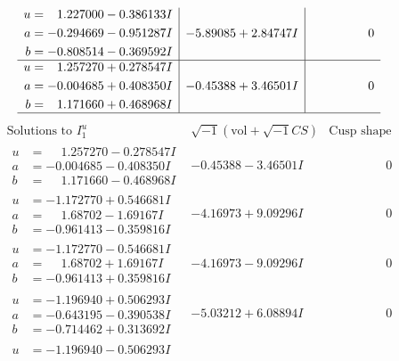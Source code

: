 \documentclass[1p]{elsarticle_modified}
\theoremstyle{definition}
\newcommand{\I}{\sqrt{-1}}
\begin{document}
$$\begin{array}{c|c|c}
\begin{aligned}
u &= \phantom{-}1.227000 - 0.386133 I \\
a &= -0.294669 - 0.951287 I \\
b &= -0.808514 - 0.369592 I\end{aligned}
 & -5.89085 + 2.84747 I & \phantom{-0.000000 } 0 \\ \hline\begin{aligned}
u &= \phantom{-}1.257270 + 0.278547 I \\
a &= -0.004685 + 0.408350 I \\
b &= \phantom{-}1.171660 + 0.468968 I\end{aligned}
 & -0.45388 + 3.46501 I & \phantom{-0.000000 } 0\\
 \hline 
 \end{array}$$\newpage$$\begin{array}{c|c|c}  
\text{Solutions to }I^u_{1}& \I (\text{vol} + \sqrt{-1}CS) & \text{Cusp shape}\\
 \hline 
\begin{aligned}
u &= \phantom{-}1.257270 - 0.278547 I \\
a &= -0.004685 - 0.408350 I \\
b &= \phantom{-}1.171660 - 0.468968 I\end{aligned}
 & -0.45388 - 3.46501 I & \phantom{-0.000000 } 0 \\ \hline\begin{aligned}
u &= -1.172770 + 0.546681 I \\
a &= \phantom{-}1.68702 - 1.69167 I \\
b &= -0.961413 - 0.359816 I\end{aligned}
 & -4.16973 + 9.09296 I & \phantom{-0.000000 } 0 \\ \hline\begin{aligned}
u &= -1.172770 - 0.546681 I \\
a &= \phantom{-}1.68702 + 1.69167 I \\
b &= -0.961413 + 0.359816 I\end{aligned}
 & -4.16973 - 9.09296 I & \phantom{-0.000000 } 0 \\ \hline\begin{aligned}
u &= -1.196940 + 0.506293 I \\
a &= -0.643195 - 0.390538 I \\
b &= -0.714462 + 0.313692 I\end{aligned}
 & -5.03212 + 6.08894 I & \phantom{-0.000000 } 0 \\ \hline\begin{aligned}
u &= -1.196940 - 0.506293 I \\

\end{aligned}
\end{array}$$
\end{document}
